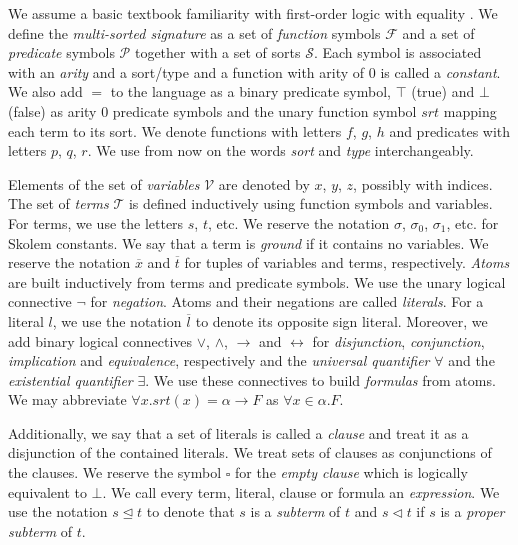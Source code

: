 
We assume a basic textbook familiarity with first-order logic with equality \cite{calculusofcomputation}. We define the \textit{multi-sorted signature} as a set of \textit{function} symbols $\mathcal{F}$ and a set of \textit{predicate} symbols $\mathcal{P}$ together with a set of sorts $\mathcal{S}$. Each symbol is associated with an \textit{arity} and a sort/type and a function with arity of 0 is called a \textit{constant}. We also add $=$ to the language as a binary predicate symbol, $\top$ (true) and $\bot$ (false) as arity 0 predicate symbols and the unary function symbol $srt$ mapping each term to its sort. We denote functions with letters $f$, $g$, $h$ and predicates with letters $p$, $q$, $r$. We use from now on the words \textit{sort} and \textit{type} interchangeably.

Elements of the set of \textit{variables} $\mathcal{V}$ are denoted by $x$, $y$, $z$, possibly with indices. The set of \textit{terms} $\mathcal{T}$ is defined inductively using function symbols and variables. For terms, we use the letters $s$, $t$, etc. We reserve the notation $\sigma$, $\sigma_0$, $\sigma_1$, etc. for Skolem constants. We say that a term is \textit{ground} if it contains no variables. We reserve the notation $\overline{x}$ and $\overline{t}$ for tuples of variables and terms, respectively. \textit{Atoms} are built inductively from terms and predicate symbols. We use the unary logical connective $\neg$ for \textit{negation}. Atoms and their negations are called \textit{literals}. For a literal $l$, we use the notation $\overline{l}$ to denote its opposite sign literal. Moreover, we add binary logical connectives $\lor$, $\land$, $\rightarrow$ and $\leftrightarrow$ for \textit{disjunction}, \textit{conjunction}, \textit{implication} and \textit{equivalence}, respectively and the \textit{universal quantifier} $\forall$ and the \textit{existential quantifier} $\exists$. We use these connectives to build \textit{formulas} from atoms. We may abbreviate $\forall x. srt(x)=\alpha\rightarrow F$ as $\forall x\in\alpha. F$.

Additionally, we say that a set of literals is called a \textit{clause} and treat it as a disjunction of the contained literals. We treat sets of clauses as conjunctions of the clauses. We reserve the symbol $\square$ for the \textit{empty clause} which is logically equivalent to $\bot$. We call every term, literal, clause or formula an \textit{expression}. We use the notation $s\trianglelefteq t$ to denote that $s$ is a \textit{subterm} of $t$ and $s\triangleleft t$ if $s$ is a \textit{proper subterm} of $t$.


